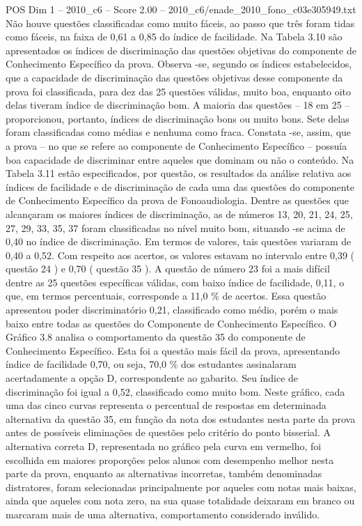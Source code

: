 \begin{textsample}{POS Dim 1 – 2010\_c6 – Score 2.00 – 2010\_c6/enade\_2010\_fono\_c03e305949.txt}
Não houve questões classificadas como muito fáceis, ao passo que três foram tidas como fáceis, na faixa de 0,61 a 0,85 do índice de facilidade.
Na Tabela 3.10 são apresentados os índices de discriminação das questões objetivas do componente de Conhecimento Específico da prova.
Observa -se, segundo os índices estabelecidos, que a capacidade de discriminação das questões objetivas desse componente da prova foi classificada, para dez das 25 questões válidas, muito boa, enquanto oito delas tiveram índice de discriminação bom.
A maioria das questões – 18 em 25 – proporcionou, portanto, índices de discriminação bons ou muito bons.
Sete delas foram classificadas como médias e nenhuma como fraca.
Constata -se, assim, que a prova – no que se refere ao componente de Conhecimento Específico – possuía boa capacidade de discriminar entre aqueles que dominam ou não o conteúdo.
Na Tabela 3.11 estão especificados, por questão, os resultados da análise relativa aos índices de facilidade e de discriminação de cada uma das questões do componente de Conhecimento Específico da prova de Fonoaudiologia.
Dentre as questões que alcançaram os maiores índices de discriminação, as de números 13, 20, 21, 24, 25, 27, 29, 33, 35, 37 foram classificadas no nível muito bom, situando -se acima de 0,40 no índice de discriminação.
Em termos de valores, tais questões variaram de 0,40 a 0,52.
Com respeito aos acertos, os valores estavam no intervalo entre 0,39 ( questão 24 ) e 0,70 ( questão 35 ).
A questão de número 23 foi a mais difícil dentre as 25 questões específicas válidas, com baixo índice de facilidade, 0,11, o que, em termos percentuais, corresponde a 11,0 \% de acertos.
Essa questão apresentou poder discriminatório 0,21, classificado como médio, porém o mais baixo entre todas as questões do Componente de Conhecimento Específico.
O Gráfico 3.8 analisa o comportamento da questão 35 do componente de Conhecimento Específico.
Esta foi a questão mais fácil da prova, apresentando índice de facilidade 0,70, ou seja, 70,0 \% dos estudantes assinalaram acertadamente a opção D, correspondente ao gabarito.
Seu índice de discriminação foi igual a 0,52, classificado como muito bom.
Neste gráfico, cada uma das cinco curvas representa o percentual de respostas em determinada alternativa da questão 35, em função da nota dos estudantes nesta parte da prova antes de possíveis eliminações de questões pelo critério do ponto bisserial.
A alternativa correta D, representada no gráfico pela curva em vermelho, foi escolhida em maiores proporções pelos alunos com desempenho melhor nesta parte da prova, enquanto as alternativas incorretas, também denominadas distratores, foram selecionadas principalmente por aqueles com notas mais baixas, ainda que aqueles com nota zero, na sua quase totalidade deixaram em branco ou marcaram mais de uma alternativa, comportamento considerado inválido.

\end{textsample}

